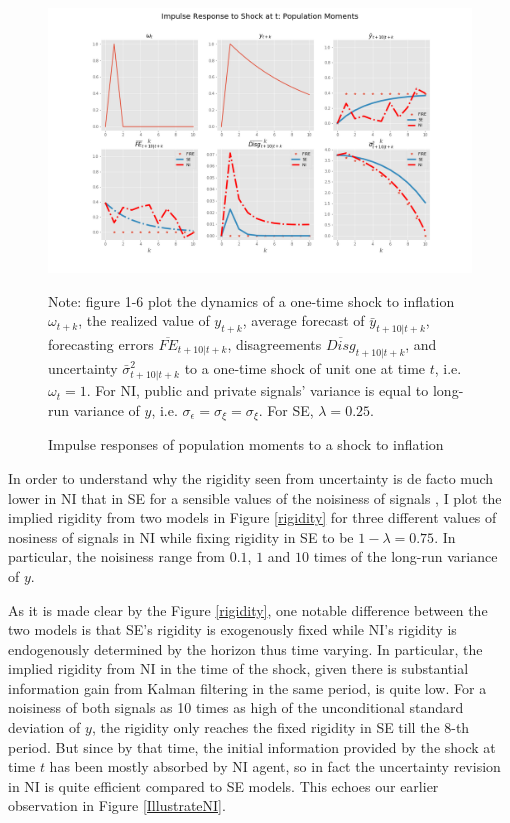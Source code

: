 \documentclass[12pt]{article}
\begin{document}
	
	\begin{figure}[ht]
		\centering
		\includegraphics[width=\textwidth]{figures/ir_popseni.png} 
		\begin{flushleft}
			{\footnotesize Note: figure 1-6 plot the dynamics of a one-time shock to inflation $\omega_{t+k}$, the realized value of $y_{t+k}$,  average forecast of $\bar y_{t+10|t+k}$, forecasting errors $\overline{FE}_{t+10|t+k}$, disagreements $\overline {Disg}_{t+10|t+k}$, and uncertainty $\bar \sigma^2_{t+10|t+k}$ to a one-time shock  of unit one at time $t$, i.e. $\omega_t=1$. For NI, public and private signals’ variance is equal to long-run variance of $y$, i.e. $\sigma_\epsilon = \sigma_\xi = \sigma_\xi $. For SE, $\lambda = 0.25$.  }
		\end{flushleft}
		\caption{Impulse responses of population moments to a shock to inflation}
		\label{ir_pop}
	\end{figure}
	
	
	
	In order to understand why the rigidity seen from uncertainty is de facto much lower in NI that in SE for a sensible values of the noisiness of signals , I plot the implied rigidity from two models in Figure \ref{rigidity} for three different values of nosiness of signals in NI while fixing rigidity in SE to be $1-\lambda =0.75$. In particular, the noisiness range from $0.1$, $1$ and $10$ times of the long-run variance of $y$. 
	
	As it is made clear by the Figure \ref{rigidity}, one notable difference between the two models is that SE's rigidity is exogenously fixed while NI's rigidity is endogenously determined by the horizon thus time varying. In particular, the implied rigidity from NI in the time of the shock, given there is substantial information gain from Kalman filtering in the same period, is quite low. For a noisiness of both signals as 10 times as high of the unconditional standard deviation of $y$, the rigidity only reaches the fixed rigidity in SE till the 8-th period. But since by that time, the initial information provided by the shock at time $t$ has been mostly absorbed by NI agent, so in fact the uncertainty revision in NI is quite efficient compared to SE models.  This echoes our earlier observation in Figure \ref{IllustrateNI}. 
	
\end{document}
